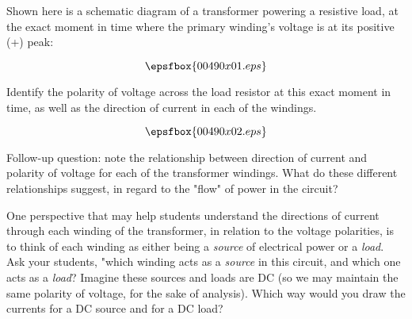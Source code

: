 

Shown here is a schematic diagram of a transformer powering a resistive load, at the exact moment in time where the primary winding's voltage is at its positive (+) peak:

$$\epsfbox{00490x01.eps}$$

Identify the polarity of voltage across the load resistor at this exact moment in time, as well as the direction of current in each of the windings.







$$\epsfbox{00490x02.eps}$$

\vskip 10pt

Follow-up question: note the relationship between direction of current and polarity of voltage for each of the transformer windings.  What do these different relationships suggest, in regard to the "flow" of power in the circuit?







One perspective that may help students understand the directions of current through each winding of the transformer, in relation to the voltage polarities, is to think of each winding as either being a {\it source} of electrical power or a {\it load}.  Ask your students, "which winding acts as a {\it source} in this circuit, and which one acts as a {\it load}?  Imagine these sources and loads are DC (so we may maintain the same polarity of voltage, for the sake of analysis).  Which way would you draw the currents for a DC source and for a DC load?




